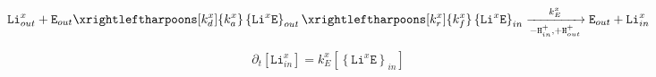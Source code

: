 \documentclass[aps,onecolumn]{revtex4}
\newcommand{\mychem}[1]{\mathtt{#1}}
\newcommand{\myconc}[1]{\left\lbrack{#1}\right\rbrack}
\begin{document}
\begin{equation}
	 \mychem{Li}_{out}^{x} +  \mychem{E}_{out}  
	 \xrightleftharpoons[k_d^x]{k_a^x} 
	 \left\lbrace\mychem{Li}^{x}\mychem{E}\right\rbrace_{out} 
	  \xrightleftharpoons[k_r^x]{k_f^x} 
	  \left\lbrace\mychem{Li}^{x}\mychem{E}\right\rbrace_{in}  
	   \xrightarrow[-\mychem{H}^+_{in},+\mychem{H}^+_{out}]{k_E^x} \mychem{E}_{out}  + \mychem{Li}_{in}^{x}
\end{equation}

\begin{equation}
	\partial_t \myconc{\mychem{Li}_{in}^x} = k_E^x \myconc{\left\lbrace\mychem{Li}^{x}\mychem{E}\right\rbrace_{in} }
\end{equation}
\end{document}
